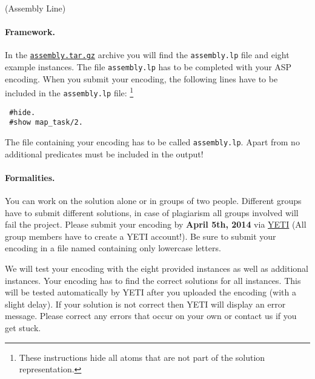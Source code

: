 \documentclass[a4paper,12pt]{article}
\begin{document}
\begin{PraktikumsAufgabe}{2}{(Assembly Line)}
\paragraph{Framework.}

\noindent
In the
\href{http://www.cs.uni-potsdam.de/wv/lehre/WS1314/????/assembly.tar.gz}{\texttt{assembly.tar.gz}}
archive you will find the \texttt{assembly.lp} file and eight example instances.
The file \texttt{assembly.lp} has to be completed with your ASP encoding.
When you submit your encoding, the following lines have to be included in the \texttt{assembly.lp} file:%
\footnote{These instructions hide all atoms that are not part of the solution representation.}%
\vspace{-1.5mm}
\begin{verbatim}
 #hide.
 #show map_task/2.
\end{verbatim}
\vspace{-1mm}
{\small\sf The file containing your encoding has to be called \texttt{assembly.lp}.
           Apart from  no additional predicates must be included in the output!}

\noindent


\noindent

\paragraph{Formalities.}
%
You can work on the solution alone or in groups of two people.
Different groups have to submit different solutions, 
in case of plagiarism all groups involved will fail the project.
Please submit your encoding by \textbf{April 5th, 2014} via
\href{https://yeti.haiti.cs.uni-potsdam.de/yeti/admin/showCourse.do?id=23}{YETI}
(All group members have to create a YETI account!).
Be sure to submit your encoding in a file named 
containing only lowercase letters.

\noindent
We will test your encoding with the eight provided instances as well as additional instances.
Your encoding has to find the correct solutions for all instances.
This will be tested automatically by YETI after you uploaded the encoding (with a slight delay).
If your solution is not correct then YETI will display an error message.
Please correct any errors that occur on your own or contact us if you get stuck.


\end{PraktikumsAufgabe}
\end{document}
